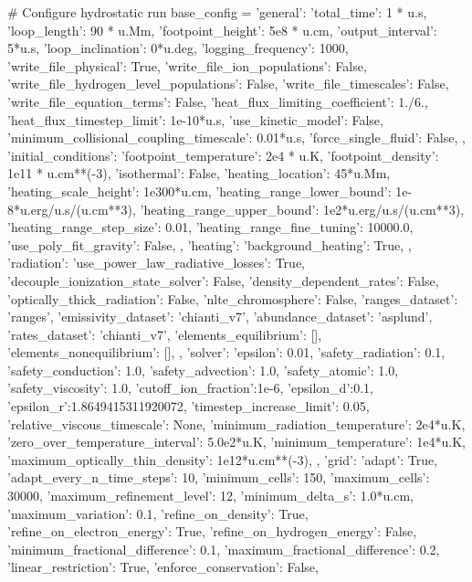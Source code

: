 \begin{pycode}[chapter2]
# Configure hydrostatic run
base_config = {
    'general': {
        'total_time': 1 * u.s,
        'loop_length': 90 * u.Mm,
        'footpoint_height': 5e8 * u.cm,
        'output_interval': 5*u.s,
        'loop_inclination': 0*u.deg,
        'logging_frequency': 1000,
        'write_file_physical': True,
        'write_file_ion_populations': False,
        'write_file_hydrogen_level_populations': False,
        'write_file_timescales': False,
        'write_file_equation_terms': False,
        'heat_flux_limiting_coefficient': 1./6.,
        'heat_flux_timestep_limit': 1e-10*u.s,
        'use_kinetic_model': False,
        'minimum_collisional_coupling_timescale': 0.01*u.s,
        'force_single_fluid': False,
    },
    'initial_conditions': {
        'footpoint_temperature': 2e4 * u.K,
        'footpoint_density': 1e11 * u.cm**(-3),
        'isothermal': False,
        'heating_location': 45*u.Mm,
        'heating_scale_height': 1e300*u.cm,
        'heating_range_lower_bound': 1e-8*u.erg/u.s/(u.cm**3),
        'heating_range_upper_bound': 1e2*u.erg/u.s/(u.cm**3),
        'heating_range_step_size': 0.01,
        'heating_range_fine_tuning': 10000.0,
        'use_poly_fit_gravity': False,
    },
    'heating': {
        'background_heating': True,
    },
    'radiation': {
        'use_power_law_radiative_losses': True,
        'decouple_ionization_state_solver': False,
        'density_dependent_rates': False,
        'optically_thick_radiation': False,
        'nlte_chromosphere': False,
        'ranges_dataset': 'ranges',
        'emissivity_dataset': 'chianti_v7',
        'abundance_dataset': 'asplund',
        'rates_dataset': 'chianti_v7',
        'elements_equilibrium': [],
        'elements_nonequilibrium': [],
    },
    'solver': {
        'epsilon': 0.01,
        'safety_radiation': 0.1,
        'safety_conduction': 1.0,
        'safety_advection': 1.0,
        'safety_atomic': 1.0,
        'safety_viscosity': 1.0,
        'cutoff_ion_fraction':1e-6,
        'epsilon_d':0.1,
        'epsilon_r':1.8649415311920072,
        'timestep_increase_limit': 0.05,
        'relative_viscous_timescale': None,
        'minimum_radiation_temperature': 2e4*u.K,
        'zero_over_temperature_interval': 5.0e2*u.K,
        'minimum_temperature': 1e4*u.K,
        'maximum_optically_thin_density': 1e12*u.cm**(-3),
    },
    'grid': {
        'adapt': True,
        'adapt_every_n_time_steps': 10,
        'minimum_cells': 150,
        'maximum_cells': 30000,
        'maximum_refinement_level': 12,
        'minimum_delta_s': 1.0*u.cm,
        'maximum_variation': 0.1,
        'refine_on_density': True,
        'refine_on_electron_energy': True,
        'refine_on_hydrogen_energy': False,
        'minimum_fractional_difference': 0.1,
        'maximum_fractional_difference': 0.2,
        'linear_restriction': True,
        'enforce_conservation': False,
    }
}


\end{pycode}
